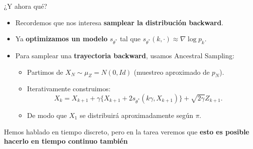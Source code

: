 \documentclass[aspectratio=169,xcolor=dvipsnames, t, spanish]{beamer}
\begin{document}
    \begin{frame}{¿Y ahora qué?}
        \begin{itemize}
            \item Recordemos que nos interesa \textbf{samplear la distribución backward}.
            \item Ya \textbf{optimizamos un modelo} $s_{\theta^{*}}$ tal que $s_{\theta^{*}}(k,\cdot)\approx\nabla \log p_{k}$.
            \item Para samplear una \textbf{trayectoria backward}, usamos Ancestral Sampling:
            \begin{itemize}
                \item Partimos de $X_{N}\sim \mu_Z = N(0,Id)$ (muestreo aproximado de $p_{N}$). %
                \item Iterativamente construimos:
                \[ X_{k}=X_{k+1}+\gamma\{X_{k+1}+2s_{\theta^{*}}(k\gamma,X_{k+1})\}+\sqrt{2\gamma}Z_{k+1}. \]
                \item De modo que $X_{1}$ se distribuirá aproximadamente según $\pi$.
            \end{itemize}
        \end{itemize}
        \pause
        \begin{center}
        Hemos hablado en tiempo discreto, pero en la tarea veremos que \textbf{esto es posible hacerlo en tiempo continuo también}
        \end{center}
    \end{frame}
    
\end{document}
